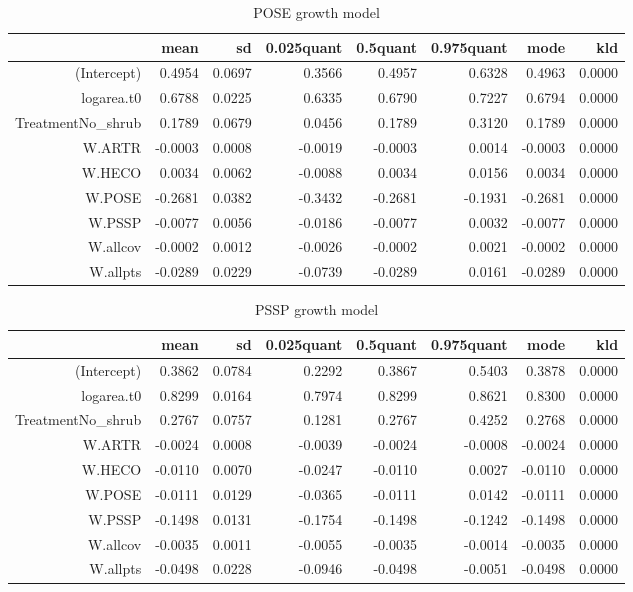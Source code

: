\begin{table}[ht]
\centering
\begin{tabular}{rrrrrrrr}
  \hline
 & mean & sd & 0.025quant & 0.5quant & 0.975quant & mode & kld \\ 
  \hline
(Intercept) & 0.4954 & 0.0697 & 0.3566 & 0.4957 & 0.6328 & 0.4963 & 0.0000 \\ 
  logarea.t0 & 0.6788 & 0.0225 & 0.6335 & 0.6790 & 0.7227 & 0.6794 & 0.0000 \\ 
  TreatmentNo\_shrub & 0.1789 & 0.0679 & 0.0456 & 0.1789 & 0.3120 & 0.1789 & 0.0000 \\ 
  W.ARTR & -0.0003 & 0.0008 & -0.0019 & -0.0003 & 0.0014 & -0.0003 & 0.0000 \\ 
  W.HECO & 0.0034 & 0.0062 & -0.0088 & 0.0034 & 0.0156 & 0.0034 & 0.0000 \\ 
  W.POSE & -0.2681 & 0.0382 & -0.3432 & -0.2681 & -0.1931 & -0.2681 & 0.0000 \\ 
  W.PSSP & -0.0077 & 0.0056 & -0.0186 & -0.0077 & 0.0032 & -0.0077 & 0.0000 \\ 
  W.allcov & -0.0002 & 0.0012 & -0.0026 & -0.0002 & 0.0021 & -0.0002 & 0.0000 \\ 
  W.allpts & -0.0289 & 0.0229 & -0.0739 & -0.0289 & 0.0161 & -0.0289 & 0.0000 \\ 
   \hline
\end{tabular}
\caption{POSE growth model} 
\label{POSEgrowth}
\end{table}

\begin{table}[ht]
\centering
\begin{tabular}{rrrrrrrr}
  \hline
 & mean & sd & 0.025quant & 0.5quant & 0.975quant & mode & kld \\ 
  \hline
(Intercept) & 0.3862 & 0.0784 & 0.2292 & 0.3867 & 0.5403 & 0.3878 & 0.0000 \\ 
  logarea.t0 & 0.8299 & 0.0164 & 0.7974 & 0.8299 & 0.8621 & 0.8300 & 0.0000 \\ 
  TreatmentNo\_shrub & 0.2767 & 0.0757 & 0.1281 & 0.2767 & 0.4252 & 0.2768 & 0.0000 \\ 
  W.ARTR & -0.0024 & 0.0008 & -0.0039 & -0.0024 & -0.0008 & -0.0024 & 0.0000 \\ 
  W.HECO & -0.0110 & 0.0070 & -0.0247 & -0.0110 & 0.0027 & -0.0110 & 0.0000 \\ 
  W.POSE & -0.0111 & 0.0129 & -0.0365 & -0.0111 & 0.0142 & -0.0111 & 0.0000 \\ 
  W.PSSP & -0.1498 & 0.0131 & -0.1754 & -0.1498 & -0.1242 & -0.1498 & 0.0000 \\ 
  W.allcov & -0.0035 & 0.0011 & -0.0055 & -0.0035 & -0.0014 & -0.0035 & 0.0000 \\ 
  W.allpts & -0.0498 & 0.0228 & -0.0946 & -0.0498 & -0.0051 & -0.0498 & 0.0000 \\ 
   \hline
\end{tabular}
\caption{PSSP growth model} 
\label{PSSPgrowth}
\end{table}


